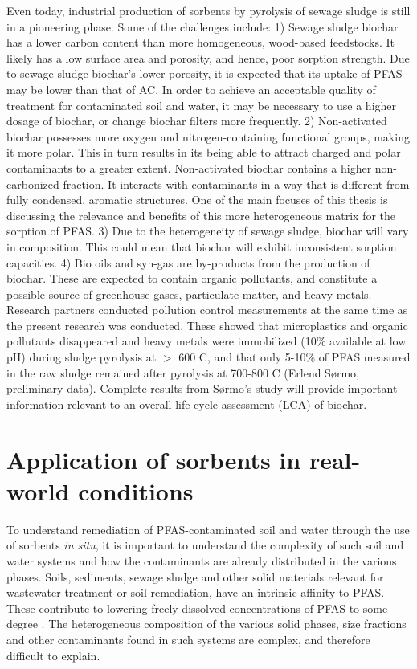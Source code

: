 Even today, industrial production of sorbents by pyrolysis of sewage sludge is still in a pioneering phase. Some of the challenges include: 1) Sewage sludge biochar has a lower carbon content than more homogeneous, wood-based feedstocks. It likely has a low surface area and porosity, and hence, poor sorption strength. Due to sewage sludge biochar's lower porosity, it is expected that its uptake of PFAS may be lower than that of AC. In order to achieve an acceptable quality of treatment for contaminated soil and water, it may be necessary to use a higher dosage of biochar, or change  biochar filters more frequently. 2) Non-activated biochar possesses more oxygen and nitrogen-containing functional groups, making it more polar. This in turn results in its being able to attract charged and polar contaminants to a greater extent. Non-activated biochar contains a higher non-carbonized fraction. It interacts with contaminants in a way that is different from fully condensed, aromatic structures. One of the main focuses of this thesis is discussing the relevance and benefits of this more heterogeneous matrix for the sorption of PFAS. 3) Due to the heterogeneity of sewage sludge, biochar will vary in composition. This could mean that biochar will exhibit inconsistent sorption capacities. 4) Bio oils and syn-gas are by-products from the production of biochar. These are expected to contain organic pollutants, and constitute a possible source of greenhouse gases, particulate matter, and heavy metals. Research partners conducted pollution control measurements at the same time as the present research was conducted. These showed that microplastics and organic pollutants disappeared and heavy metals were immobilized (10\% available at low pH) during sludge pyrolysis at $>$ 600 \textdegree C, and that only 5-10\% of PFAS measured in the raw sludge remained after pyrolysis at 700-800 \textdegree C (Erlend S\o rmo, preliminary data). Complete results from S\o rmo's study will provide important information relevant to an overall life cycle assessment (\acrshort{LCA}) of biochar.

\section{Application of sorbents in real-world conditions \label{sec:naturalconditions}}
To understand remediation of PFAS-contaminated soil and water through the use of sorbents \textit{in situ}, it is important to understand the complexity of such soil and water systems and how the contaminants are already distributed in the various phases. Soils, sediments, sewage sludge and other solid materials relevant for wastewater treatment or soil remediation, have an intrinsic affinity to PFAS. These contribute to lowering freely dissolved concentrations of PFAS to some degree \citep{arvaniti2014,zhang2013sorption}. The heterogeneous composition of the various solid phases, size fractions and other contaminants found in such systems are complex, and therefore difficult to explain. 

